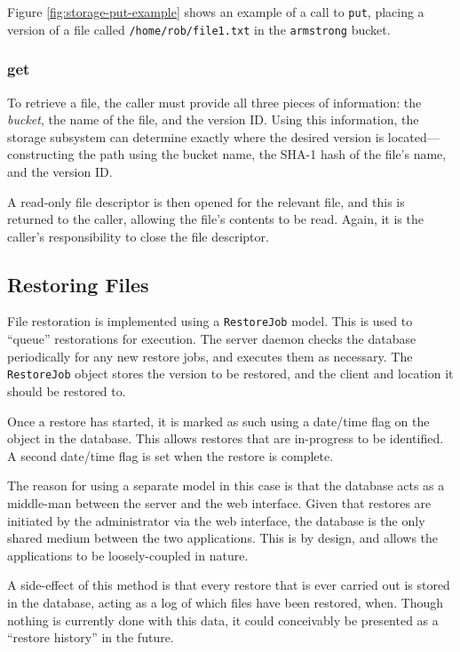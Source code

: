 Figure \ref{fig:storage-put-example} shows an example of a call to \verb!put!,
placing a version of a file called \verb!/home/rob/file1.txt! in the
\verb!armstrong! bucket.

\subsubsection{get}
\label{sec:implementation-server-storage-get}

To retrieve a file, the caller must provide all three pieces of information:
the \emph{bucket}, the name of the file, and the version ID. Using this
information, the storage subsystem can determine exactly where the desired
version is located---constructing the path using the bucket name, the SHA-1
hash of the file's name, and the version ID.

A read-only file descriptor is then opened for the relevant file, and this is
returned to the caller, allowing the file's contents to be read. Again, it is
the caller's responsibility to close the file descriptor.

\subsection{Restoring Files}
\label{sec:implementation-server-restoring}

File restoration is implemented using a \verb!RestoreJob! model. This is used
to ``queue'' restorations for execution. The server daemon checks the database
periodically for any new restore jobs, and executes them as necessary. The
\verb!RestoreJob! object stores the version to be restored, and the client and
location it should be restored to.

Once a restore has started, it is marked as such using a date/time flag on the
object in the database. This allows restores that are in-progress to be
identified. A second date/time flag is set when the restore is complete.

The reason for using a separate model in this case is that the database acts as
a middle-man between the server and the web interface. Given that restores are
initiated by the administrator via the web interface, the database is the only
shared medium between the two applications. This is by design, and allows the
applications to be loosely-coupled in nature.

A side-effect of this method is that every restore that is ever carried out is
stored in the database, acting as a log of which files have been restored,
when. Though nothing is currently done with this data, it could conceivably be
presented as a ``restore history'' in the future.

